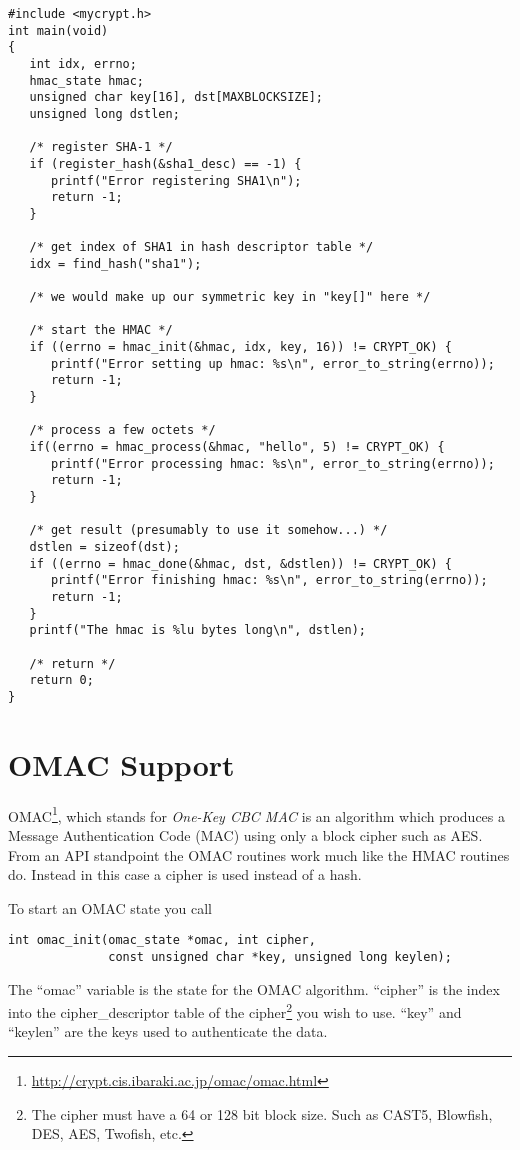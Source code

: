 \documentclass[b5paper]{book}
\begin{document}
\begin{small}
\begin{verbatim}
#include <mycrypt.h>
int main(void)
{
   int idx, errno;
   hmac_state hmac;
   unsigned char key[16], dst[MAXBLOCKSIZE];
   unsigned long dstlen;

   /* register SHA-1 */
   if (register_hash(&sha1_desc) == -1) {
      printf("Error registering SHA1\n");
      return -1;
   }

   /* get index of SHA1 in hash descriptor table */
   idx = find_hash("sha1");

   /* we would make up our symmetric key in "key[]" here */

   /* start the HMAC */
   if ((errno = hmac_init(&hmac, idx, key, 16)) != CRYPT_OK) {
      printf("Error setting up hmac: %s\n", error_to_string(errno));
      return -1;
   }

   /* process a few octets */
   if((errno = hmac_process(&hmac, "hello", 5) != CRYPT_OK) {
      printf("Error processing hmac: %s\n", error_to_string(errno));
      return -1;
   }

   /* get result (presumably to use it somehow...) */
   dstlen = sizeof(dst);
   if ((errno = hmac_done(&hmac, dst, &dstlen)) != CRYPT_OK) {
      printf("Error finishing hmac: %s\n", error_to_string(errno));
      return -1;
   }
   printf("The hmac is %lu bytes long\n", dstlen);
  
   /* return */
   return 0;
}
\end{verbatim}
\end{small}

\section{OMAC Support}
OMAC\footnote{\url{http://crypt.cis.ibaraki.ac.jp/omac/omac.html}}, which stands for \textit{One-Key CBC MAC} is an 
algorithm which produces a Message Authentication Code (MAC) using only a block cipher such as AES.  From an API 
standpoint the OMAC routines work much like the HMAC routines do.  Instead in this case a cipher is used instead of a hash.  

To start an OMAC state you call

\begin{verbatim}
int omac_init(omac_state *omac, int cipher, 
              const unsigned char *key, unsigned long keylen);
\end{verbatim}
The ``omac'' variable is the state for the OMAC algorithm.  ``cipher'' is the index into the cipher\_descriptor table
of the cipher\footnote{The cipher must have a 64 or 128 bit block size.  Such as CAST5, Blowfish, DES, AES, Twofish, etc.} you
wish to use.  ``key'' and ``keylen'' are the keys used to authenticate the data.
\end{document}
